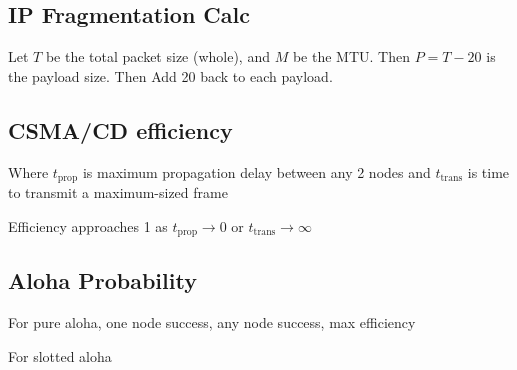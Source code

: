 \subsection{IP Fragmentation Calc}
Let $T$ be the total packet size (whole), and $M$ be the MTU. Then
$P=T-20$ is the payload size. Then
Add 20 back to each payload.
\subsection{CSMA/CD efficiency}
Where $t_{\text{prop}}$ is maximum propagation delay between any 2 nodes
and $t_{\text{trans}}$ is time to transmit a maximum-sized frame


Efficiency approaches 1 as $t_{\text{prop}}\to 0$ or
$t_{\text{trans}}\to\infty$
\subsection{Aloha Probability}
For pure aloha, one node success, any node success, max efficiency


For slotted aloha

